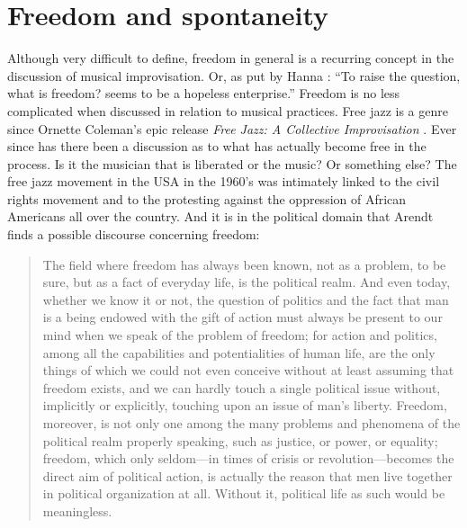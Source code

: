 \documentclass[a4paper]{article}
\begin{document}
\section*{Freedom and spontaneity}
\label{sec:freed-artist-prod}

Although very difficult to define, freedom in general is a recurring concept in the discussion of musical improvisation. Or, as put by Hanna \citet{arendt77}: ``To raise the question, what is freedom? seems to be a hopeless enterprise.'' Freedom is no less complicated when discussed in relation to musical practices. Free jazz is a genre since Ornette Coleman's epic release \emph{Free Jazz: A Collective Improvisation} \citep{coleman60}. Ever since has there been a discussion as to what has actually become free in the process. Is it the musician that is liberated or the music? Or something else? The free jazz movement in the USA in the 1960's was intimately linked to the civil rights movement and to the protesting against the oppression of African Americans all over the country. And it is in the political domain that Arendt finds a possible discourse concerning freedom:

\begin{quote}
  The field where freedom has always been known, not as a problem, to be sure, but as a fact of   everyday life, is the political realm. And even today, whether we know it or not, the question   of politics and the fact that man is a being endowed with the gift of action must always be   present to our mind when we speak of the problem of freedom; for action and politics, among   all the capabilities and potentialities of human life, are the only things of which we could   not even conceive without at least assuming that freedom exists, and we can hardly touch a   single political issue without, implicitly or explicitly, touching upon an issue of man's   liberty.  Freedom, moreover, is not only one among the many problems and phenomena of the   political realm properly speaking, such as justice, or power, or equality; freedom, which only   seldom---in times of crisis or revolution---becomes the direct aim of political action, is   actually the reason that men live together in political organization at all. Without it,   political life as such would be meaningless. \citep{arendt77}
\end{quote}
\end{document}
